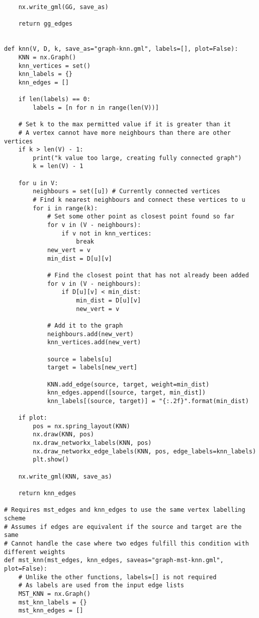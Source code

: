\documentclass[11pt, a4paper]{article}
\begin{document}
\begin{verbatim}
    nx.write_gml(GG, save_as)
    
    return gg_edges
    
        
def knn(V, D, k, save_as="graph-knn.gml", labels=[], plot=False):
    KNN = nx.Graph()
    knn_vertices = set()
    knn_labels = {}
    knn_edges = []
    
    if len(labels) == 0:
        labels = [n for n in range(len(V))]

    # Set k to the max permitted value if it is greater than it
    # A vertex cannot have more neighbours than there are other vertices
    if k > len(V) - 1:
        print("k value too large, creating fully connected graph")
        k = len(V) - 1

    for u in V:
        neighbours = set([u]) # Currently connected vertices
        # Find k nearest neighbours and connect these vertices to u
        for i in range(k):
            # Set some other point as closest point found so far
            for v in (V - neighbours):
                if v not in knn_vertices:
                    break
            new_vert = v
            min_dist = D[u][v]
            
            # Find the closest point that has not already been added
            for v in (V - neighbours):
                if D[u][v] < min_dist:
                    min_dist = D[u][v]
                    new_vert = v
            
            # Add it to the graph
            neighbours.add(new_vert)
            knn_vertices.add(new_vert)
            
            source = labels[u]
            target = labels[new_vert]
            
            KNN.add_edge(source, target, weight=min_dist)
            knn_edges.append([source, target, min_dist])
            knn_labels[(source, target)] = "{:.2f}".format(min_dist)
            
    if plot:
        pos = nx.spring_layout(KNN)
        nx.draw(KNN, pos)
        nx.draw_networkx_labels(KNN, pos)
        nx.draw_networkx_edge_labels(KNN, pos, edge_labels=knn_labels)
        plt.show()
    
    nx.write_gml(KNN, save_as)
    
    return knn_edges

# Requires mst_edges and knn_edges to use the same vertex labelling scheme
# Assumes if edges are equivalent if the source and target are the same
# Cannot handle the case where two edges fulfill this condition with different weights
def mst_knn(mst_edges, knn_edges, saveas="graph-mst-knn.gml", plot=False):
    # Unlike the other functions, labels=[] is not required
    # As labels are used from the input edge lists
    MST_KNN = nx.Graph()
    mst_knn_labels = {}
    mst_knn_edges = []


\end{verbatim}
\end{document}
